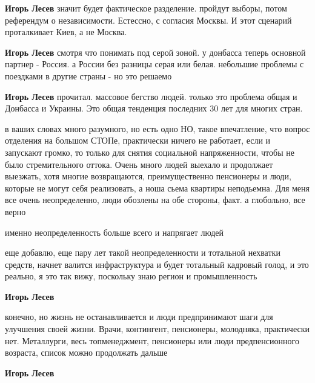 \begin{itemize}
\begin{itemize}
\textbf{Игорь Лесев} значит будет фактическое разделение. пройдут выборы, потом референдум о независимости. Естессно, с согласия Москвы. И этот сценарий проталкивает Киев, а не Москва.

\textbf{Игорь Лесев} смотря что понимать под серой зоной. у донбасса теперь основной партнер - Россия. а России без разницы серая или белая. небольшие проблемы с поездками в другие страны - но это решаемо

\textbf{Игорь Лесев} прочитал. массовое бегство людей. только это проблема общая и Донбасса и Украины. Это общая тенденция последних 30 лет для многих стран.
\end{itemize} %


в ваших словах много разумного, но есть одно НО, такое впечатление, что вопрос
отделения на большом СТОПе, практически ничего не работает, если и запускают
громко, то только для снятия социальной напряженности, чтобы не было
стремительного оттока. Очень много людей выехало и продолжает выезжать, хотя
многие возвращаются, преимущественно пенсионеры и люди, которые не могут себя
реализовать, а ноша сьема квартиры неподьемна. Для меня все очень
неопределенно, люди обозлены на обе стороны, факт. а глобольно, все верно

\begin{itemize} %
именно неопределенность больше всего и напрягает людей


еще добавлю, еще пару лет такой неопределенности и тотальной нехватки средств,
начнет валится инфраструктура и будет тотальный кадровый голод, и это реально,
я это так вижу, поскольку знаю регион и промышленность


\textbf{Игорь Лесев} 

конечно, но жизнь не останавливается и люди предпринимают шаги для улучшения
своей жизни. Врачи, контингент, пенсионеры, молодняка, практически нет.
Металлурги, весь топменеджмент, пенсионеры или люди предпенсионного возраста,
список можно продолжать дальше

\textbf{Игорь Лесев} 


\end{itemize}
\end{itemize}
